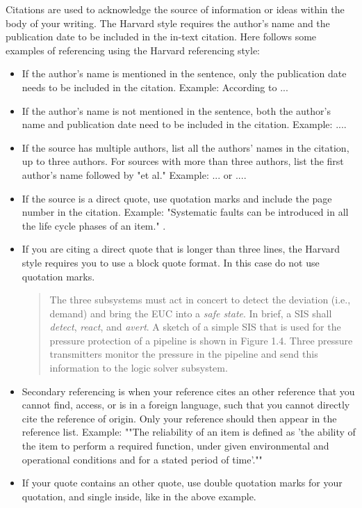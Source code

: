 Citations are used to acknowledge the source of information or ideas within the body of your writing. The Harvard style requires the author's name and the publication date to be included in the in-text citation. Here follows some examples of referencing using the Harvard referencing style:
\begin{itemize}
    \item If the author's name is mentioned in the sentence, only the publication date needs to be included in the citation. Example: According to \textcite{Rausand:2014}...
    \item If the author's name is not mentioned in the sentence, both the author's name and publication date need to be included in the citation. Example: ...\parencite{Rausand:2014}.
    \item If the source has multiple authors, list all the authors' names in the citation, up to three authors. For sources with more than three authors, list the first author's name followed by "et al." Example: ... \parencite{Rausand:Høyland:2004} or ...\parencite{Robles:2012}.
    \item If the source is a direct quote, use quotation marks and include the page number in the citation. Example: "Systematic faults can be introduced in all the life cycle phases of an item." \parencite[67]{Rausand:2014}.
    \item If you are citing a direct quote that is longer than three lines, the Harvard style requires you to use a block quote format. In this case do not use quotation marks.
    \begin{quote}   
        The three subsystems must act in concert to detect the deviation (i.e., demand) and bring the EUC into a \textit{safe state}. In brief, a SIS shall \textit{detect}, \textit{react}, and \textit{avert}. A sketch of a simple SIS that is used for the pressure protection of a pipeline is shown in Figure 1.4. Three pressure transmitters monitor the pressure in the pipeline and send this information to the logic solver subsystem. \parencite[9--10]{Rausand:Høyland:2004}
    \end{quote}
    \item Secondary referencing is when your reference cites an other reference that you cannot find, access, or is in a foreign language, such that you cannot directly cite the reference of origin. Only your reference should then appear in the reference list.  Example: ""The reliability of an item is defined as 'the ability of the item to perform a required function, under given environmental and operational conditions and for a stated period of time'."" \parencite[Rausand and Høyland, 2004, as cited in][2]{Rausand:2014}
    \item If your quote contains an other quote, use double quotation marks for your quotation, and single inside, like in the above example. 
\end{itemize}


